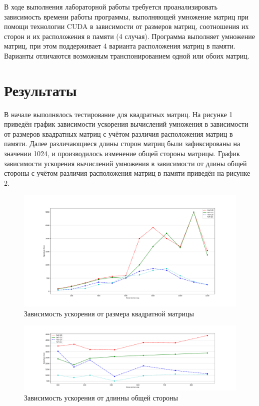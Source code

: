 \documentclass[12pt, a4paper]{article}
\begin{document}
В ходе выполнения лабораторной работы требуется проанализировать
зависимость времени работы программы, выполняющей умножение матриц при
помощи технологии CUDA в зависимости от размеров матриц, соотношения их
сторон и их расположения в памяти (4 случая).
Программа выполняет умножение матриц, при этом поддерживает 4
варианта расположения матриц в памяти. Варианты отличаются возможным
транспонированием одной или обоих матриц.

\section{Результаты}

В начале выполнялось тестирование для квадратных матриц. На
рисунке 1 приведён график зависимости ускорения вычислений умножения в
зависимости от размеров квадратных матриц с учётом различия расположения
матриц в памяти.
Далее различающиеся длины сторон матриц были зафиксированы на
значении 1024, и производилось изменение общей стороны матрицы. График
зависимости ускорения вычислений умножения в зависимости от длины общей
стороны с учётом различия расположения матриц в памяти приведён на
рисунке 2.

\begin{figure}[H]
	\centering
	\includegraphics[width=\textwidth]{img/1.pdf}
	\caption{Зависимость ускорения от размера квадратной матрицы}
	\label{img:1}
\end{figure}

\begin{figure}[H]
	\centering
	\includegraphics[width=\textwidth]{img/2.pdf}
	\caption{Зависимость ускорения от длинны общей стороны}
	\label{img:2}
\end{figure}
	
\end{document}
